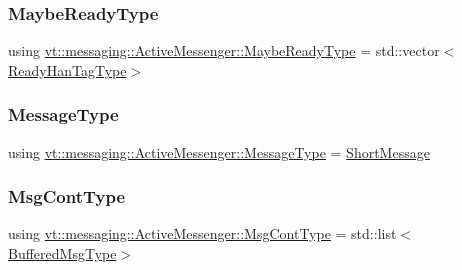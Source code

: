 \subsubsection{\texorpdfstring{Maybe\+Ready\+Type}{MaybeReadyType}}
{\footnotesize\ttfamily using \hyperlink{structvt_1_1messaging_1_1_active_messenger_a745d5e8cad8c2f67d20479afacc6e134}{vt\+::messaging\+::\+Active\+Messenger\+::\+Maybe\+Ready\+Type} =  std\+::vector$<$\hyperlink{structvt_1_1messaging_1_1_active_messenger_a98bb74aa4a561161dd7c7073dcd5f1d3}{Ready\+Han\+Tag\+Type}$>$}

\mbox{\label{structvt_1_1messaging_1_1_active_messenger_a720a2b1e7462d414b2a51d9fe005eca9}} 
\subsubsection{\texorpdfstring{Message\+Type}{MessageType}}
{\footnotesize\ttfamily using \hyperlink{structvt_1_1messaging_1_1_active_messenger_a720a2b1e7462d414b2a51d9fe005eca9}{vt\+::messaging\+::\+Active\+Messenger\+::\+Message\+Type} =  \hyperlink{namespacevt_a1125ac1da6c0bbf141e0ea0739d7602d}{Short\+Message}}

\mbox{\label{structvt_1_1messaging_1_1_active_messenger_a18bbfbf9ecd82b33f6fc475b2e5290a5}} 
\subsubsection{\texorpdfstring{Msg\+Cont\+Type}{MsgContType}}
{\footnotesize\ttfamily using \hyperlink{structvt_1_1messaging_1_1_active_messenger_a18bbfbf9ecd82b33f6fc475b2e5290a5}{vt\+::messaging\+::\+Active\+Messenger\+::\+Msg\+Cont\+Type} =  std\+::list$<$\hyperlink{structvt_1_1messaging_1_1_active_messenger_a80a9cbda399d7bf035bfcecc761f4b02}{Buffered\+Msg\+Type}$>$}

\mbox{\label{structvt_1_1messaging_1_1_active_messenger_add1d7ab7bf168d53dfe7b93f29f64f02}} 
